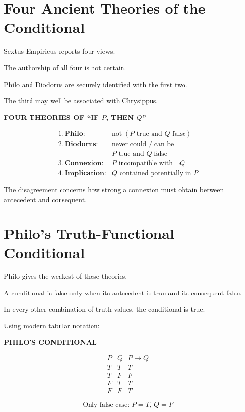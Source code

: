 \documentclass[11pt]{article}
\begin{document}
\section{Four Ancient Theories of the Conditional}

Sextus Empiricus reports four views.

The authorship of all four is not certain.

Philo and Diodorus are securely identified with the first two.

The third may well be associated with Chrysippus.

\begin{whiteboard}
\textbf{FOUR THEORIES OF ``IF \(P\), THEN \(Q\)''}

\[
\begin{array}{rl}
1.\ \textbf{Philo:}
&
\text{not }(P\text{ true and }Q\text{ false})
\\[0.5em]
2.\ \textbf{Diodorus:}
&
\text{never could / can be}\\
&
P\text{ true and }Q\text{ false}
\\[0.5em]
3.\ \textbf{Connexion:}
&
P\text{ incompatible with }\neg Q
\\[0.5em]
4.\ \textbf{Implication:}
&
Q\text{ contained potentially in }P
\end{array}
\]
\end{whiteboard}

The disagreement concerns how strong a connexion must obtain
between antecedent and consequent.

\section{Philo's Truth-Functional Conditional}

Philo gives the weakest of these theories.

A conditional is false only when its antecedent is true and its
consequent false.

In every other combination of truth-values, the conditional is
true.

Using modern tabular notation:

\begin{whiteboard}
\textbf{PHILO'S CONDITIONAL}

\[
\begin{array}{c|c|c}
P & Q & P\rightarrow Q\\
\hline
T & T & T\\
T & F & F\\
F & T & T\\
F & F & T
\end{array}
\]

\[
\boxed{
\text{Only false case: }
P=T,\ Q=F
}
\]
\end{whiteboard}
\end{document}
